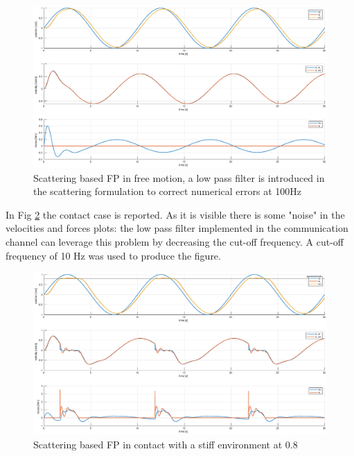 \documentclass[a4paper,12pt]{article}
\begin{document}
\begin{figure}[H]
    \begin{center}
        \hspace*{-4.5cm}
        \includegraphics[scale=0.5]{images/scat_pf_free.eps}
    \end{center}
    \caption{Scattering based FP in free motion, a low pass filter is introduced in the scattering formulation to correct numerical errors at 100Hz}
    \label{fig:scat_pf_free}
\end{figure}

\newpage
In Fig \ref{fig:scat_pf_contact} the contact case is reported. As it is visible there is some "noise" in the velocities and forces plots: the low pass filter implemented in the communication channel can leverage this problem by decreasing the cut-off frequency. A cut-off frequency of 10 Hz was used to produce the figure.

\begin{figure}[H]
    \begin{center}
        \hspace*{-4.5cm}
        \includegraphics[scale=0.5]{images/scat_pf_contact.eps}
    \end{center}
    \caption{Scattering based FP in contact with a stiff environment at 0.8}
    \label{fig:scat_pf_contact}
\end{figure}
\end{document}
